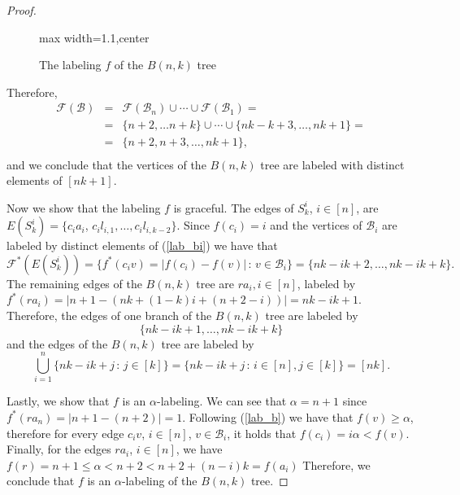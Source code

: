 \documentclass[10pt]{article}
\theoremstyle{definition}
\begin{document}
\begin{proof}
\begin{figure}[H]
\begin{adjustbox}{max width=1.1\textwidth,center}
    \end{adjustbox}
    \caption{The labeling $f$ of the  $B(n, k)$ tree}
    \label{fig:B(n,k)}
  \end{figure}
  Therefore,
  \begin{equation}\label{lab_b}
    \begin{array}{lcl}
      \mathcal{F}(\mathcal{B}) & = & \mathcal{F}(\mathcal{B}_n) \cup \cdots \cup \mathcal{F}(\mathcal{B}_{1}) = \\ & = &
      \{n+2, \ldots n+k\} \cup \cdots \cup \{nk-k+3, \ldots , nk+1\} = \\
      & = & \{ n + 2, n + 3, \dots, nk + 1\},\\
    \end{array}
  \end{equation}
  and we conclude that the vertices of the $B(n,k)$ tree are labeled with distinct elements of $[nk + 1]$.

  Now we show that the labeling $f$ is graceful. The edges of $S_k^i$, $i \in [n]$, are $E(S_k^i) = \{c_i a_i$, $c_i l_{i,1}, \ldots, c_i l_{i, k-2}\}$. Since $f(c_i) = i$ and the vertices of $\mathcal{B}_i$ are labeled by distinct elements of (\ref{lab_bi}) we have that
  $$
  \mathcal{F}^*(E(S_k^i)) = \{ f^*(c_i v) = |f(c_i) - f(v)| \, : \, v \in \mathcal{B}_i \}
  = \{nk - ik + 2, \ldots, nk - ik +k\}.
  $$
  The remaining edges of the $B(n,k)$ tree are $ra_i, i \in [n]$, labeled by $f^*(r a_i) = | n+1 - ( nk + (1-k)i + (n+2-i))| = nk - ik + 1$. Therefore, the edges of one branch of the $B(n,k)$ tree are labeled by
  $$
  \{nk - ik + 1, \ldots, nk - ik +k\}
  $$
  and the edges of the $B(n,k)$ tree are labeled by
  $$
  \displaystyle{\bigcup_{i = 1}^n} \{nk - ik +j \, : \, j \in [k] \} = \{ nk - ik +j \, : \, i \in [n], j \in [k] \} = [nk].
  $$

  Lastly, we show that $f$ is an $\alpha$-labeling. We can see that $\alpha = n + 1$ since $f^*(ra_n) = |n + 1 - (n + 2)| = 1$. Following (\ref{lab_b}) we have that $f(v) \ge \alpha$, therefore for every edge $c_i v$, $i \in [n]$, $v \in \mathcal{B}_i$, it holds that $f(c_i) = i \alpha < f(v)$. Finally, for the edges $r a_i$, $i \in [n]$, we have $f(r) = n + 1 \leq \alpha < n + 2 < n + 2 + (n - i)k = f(a_i)$
  Therefore, we conclude that $f$ is an $\alpha$-labeling of the $B(n, k)$ tree.
\end{proof}
\end{document}
